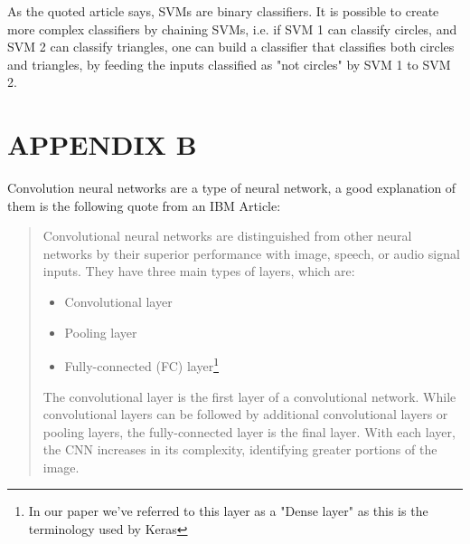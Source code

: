 \documentclass[conference]{IEEEtran}
\begin{document}
As the quoted article says, SVMs are binary classifiers. It is possible to create more complex
classifiers by chaining SVMs, i.e. if SVM 1 can classify circles, and SVM 2 can classify triangles,
one can build a classifier that classifies both circles and triangles, by feeding the inputs classified
as "not circles" by SVM 1 to SVM 2.

\section*{APPENDIX B}\label{appendix-cnn}

Convolution neural networks are a type of neural network, a good explanation of them is the following quote
from an IBM Article:

\blockcquote[What are convolutional neural networks?]{ibm-article}{Convolutional neural networks are distinguished from other neural networks by their superior performance with image, speech, or audio signal inputs. They have three main types of layers, which are:

\begin{itemize}
    \item Convolutional layer
    \item Pooling layer
    \item Fully-connected (FC) layer\footnote{In our paper we've referred to this layer as a "Dense layer" as this is the terminology used by Keras}
\end{itemize}

The convolutional layer is the first layer of a convolutional network. While convolutional layers can be followed by additional convolutional layers or pooling layers, the fully-connected layer is the final layer. With each layer, the CNN increases in its complexity, identifying greater portions of the image.
}




\end{document}
